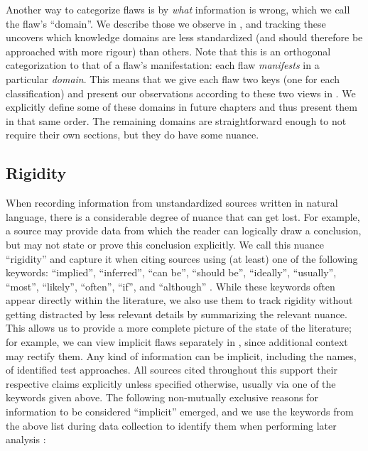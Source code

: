 \ifnotpaper \newpage \fi



Another way to categorize flaws is by \emph{what} information is wrong, which
we call the flaw's ``domain''. We describe those we observe in
, and tracking these uncovers which knowledge domains
are less standardized (and should therefore be approached with more rigour)
than others. Note that this is an orthogonal categorization to that of a flaw's
manifestation: each flaw \emph{manifests} in a particular \emph{domain}. This
means that we give each flaw two keys (one for each classification) and
present our observations according to these two views in . We explicitly define some of these domains in future
chapters and thus present them in that same order. The remaining domains are
straightforward enough to not require their own sections, but they do have some
nuance.

\subsection{Rigidity}\label{rigidity}

\def\impKeywordsCode{\seeSrcCode{82167b7}{scripts/helpers.py}{21}{49}}

When recording information from unstandardized sources written in natural
language, there is a considerable degree of nuance that can get lost. For
example, a source may provide data from which the reader can logically draw a
conclusion, but may not state or prove this conclusion explicitly.
We call this nuance ``rigidity'' and capture it when citing sources using
(at least) one of the following keywords: ``implied'', ``inferred'',
``can be'', ``should be'', ``ideally'', ``usually'', ``most'', ``likely'',
``often'', ``if'', and ``although''%
. While these keywords often appear
directly within the literature, we also use them to track rigidity without
getting distracted by less relevant details by summarizing the relevant
nuance. This allows us to provide a more complete picture of the state of
the literature; for example, we can view implicit flaws separately in
, since additional context may rectify
them. Any kind of information can be implicit, including the names,
\approachFields{} of identified test approaches. All sources cited throughout
this \docType{} support their respective
claims explicitly unless specified otherwise, usually via one of the
keywords given above. The following non-mutually
exclusive reasons for information to be considered ``implicit'' emerged, and we
use the keywords from the above list during data collection to identify them
when performing later analysis \impKeywordsCode{}:

